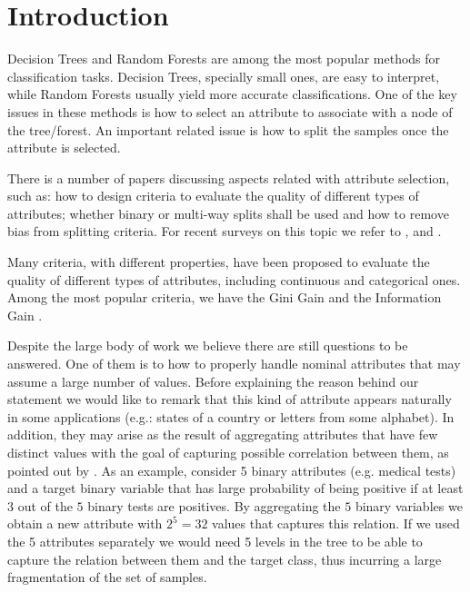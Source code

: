 \newpage

\chapter{Introduction}
\label{chap:introduction}

Decision Trees and Random Forests are among the most popular 
methods for classification tasks. Decision Trees, specially small ones, are easy to interpret,
while Random Forests usually yield more accurate classifications. One of the key issues in these methods
is how to select an attribute to associate with a node of the tree/forest. An important
related issue is how to split the samples once the attribute is selected.

There is a number of papers  discussing aspects related with 
attribute selection, such as:
how to design criteria to evaluate the quality of different types of attributes;
whether binary or multi-way splits shall be used and
how to remove bias from  splitting criteria.
For recent surveys on this topic we refer to \cite{books/sp/datamining2005/RokachM05},
\cite{Loh2014} and \cite{series/sbcs/BarrosCF15}.

Many criteria, with different properties,  have been proposed to evaluate 
the quality of different types of attributes, including
continuous and categorical ones.  Among the most popular criteria,
we have the Gini Gain and the Information Gain \cite{}.

Despite the large body of work we believe  there are still questions to be answered.
One of them is to how to  properly handle nominal  attributes that may assume a large number of values.
Before explaining the reason behind our  statement we would
like to remark that this kind of attribute
appears naturally in some applications  (e.g.: states of a country or letters from some alphabet).
In addition, they may arise as the result of aggregating
attributes that have few distinct values
with the goal of capturing possible correlation between them, as pointed out by \cite{Chou:91}.
As an example, consider 5 binary attributes (e.g. medical tests) and a
target binary variable  that has large probability of being positive if at least $3$ out
of the $5$ binary tests are positives. By aggregating
the $5$ binary variables we obtain a new attribute with $2^5=32$
values that  captures  this relation. 
If we used the 5 attributes separately we would 
need 5 levels in the tree to be able to capture the relation between
them and the target class, thus 
incurring a large fragmentation of the set of samples.

